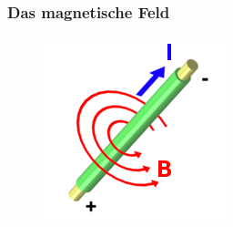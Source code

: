 \begin{frame}
    \frametitle{Das magnetische Feld}

    \begin{center}
        \begin{minipage}{0.45\textwidth}
            \begin{center}
               \begin{figure}
          \includegraphics[width=\textwidth,height=.3\textheight,keepaspectratio]{e08/RechteHand.png}
        \end{figure}
            \end{center}
        \end{minipage}
        \begin{minipage}{0.45\textwidth}
            \begin{center}
                \begin{figure}

\end{figure}
\end{center}
\end{minipage}
\end{center}
\end{frame}
